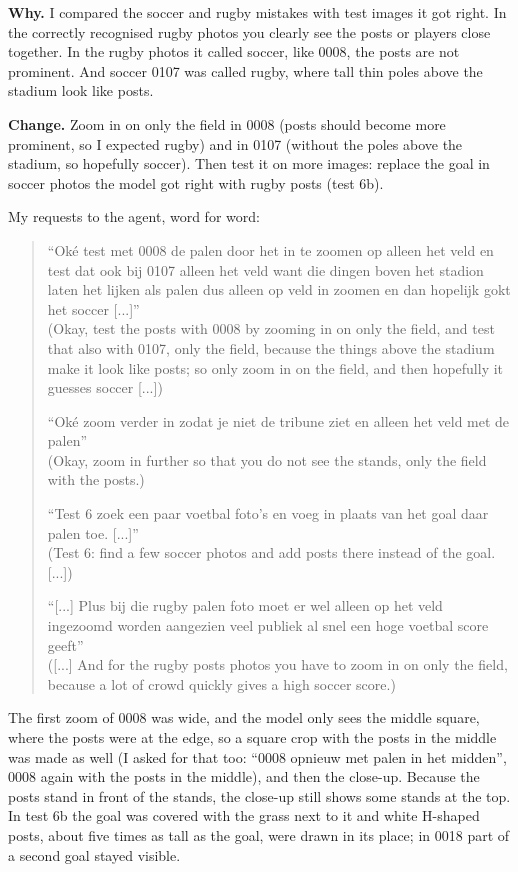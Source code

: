 \documentclass[11pt]{article}
\begin{document}
\textbf{Why.} I compared the soccer and rugby mistakes with test images it got
right. In the correctly recognised rugby photos you clearly see the posts or
players close together. In the rugby photos it called soccer, like 0008, the posts
are not prominent. And soccer 0107 was called rugby, where tall thin poles above
the stadium look like posts.

\begin{center}\end{center}

\textbf{Change.} Zoom in on only the field in 0008 (posts should become more
prominent, so I expected rugby) and in 0107 (without the poles above the stadium,
so hopefully soccer). Then test it on more images: replace the goal in soccer
photos the model got right with rugby posts (test 6b).

My requests to the agent, word for word:
\begin{quote}
``Oké test met 0008 de palen door het in te zoomen op alleen het veld en test dat
ook bij 0107 alleen het veld want die dingen boven het stadion laten het lijken als
palen dus alleen op veld in zoomen en dan hopelijk gokt het soccer [...]''\\
(Okay, test the posts with 0008 by zooming in on only the field, and test that also
with 0107, only the field, because the things above the stadium make it look like
posts; so only zoom in on the field, and then hopefully it guesses soccer [...])

``Oké zoom verder in zodat je niet de tribune ziet en alleen het veld met de
palen''\\
(Okay, zoom in further so that you do not see the stands, only the field with the
posts.)

``Test 6 zoek een paar voetbal foto’s en voeg in plaats van het goal daar palen
toe. [...]''\\
(Test 6: find a few soccer photos and add posts there instead of the goal. [...])

``[...] Plus bij die rugby palen foto moet er wel alleen op het veld ingezoomd
worden aangezien veel publiek al snel een hoge voetbal score geeft''\\
([...] And for the rugby posts photos you have to zoom in on only the field,
because a lot of crowd quickly gives a high soccer score.)
\end{quote}

The first zoom of 0008 was wide, and the model only sees the middle square, where
the posts were at the edge, so a square crop with the posts in the middle was made
as well (I asked for that too: ``0008 opnieuw met palen in het midden'', 0008 again
with the posts in the middle), and then the close-up. Because the posts stand in front of the
stands, the close-up still shows some stands at the top. In test 6b the goal was
covered with the grass next to it and white H-shaped posts, about five times as
tall as the goal, were drawn in its place; in 0018 part of a second goal stayed
visible.
\end{document}
